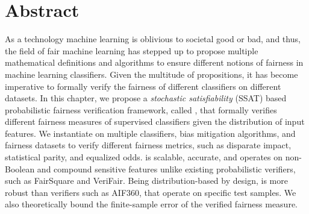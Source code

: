 \section{Abstract}
	As a technology machine learning is oblivious to societal good or bad, and thus, the field of fair machine learning has stepped up to propose multiple mathematical definitions and algorithms to ensure different notions of fairness in machine learning classifiers.	Given the multitude of propositions, it has become imperative to formally verify the fairness of different classifiers on different datasets.	In this chapter, we propose a \textit{stochastic satisfiability} (SSAT) based probabilistic fairness verification framework, called {\justicia}, that formally verifies different fairness measures of supervised classifiers given the distribution of input features. We instantiate {\justicia} on multiple classifiers, bias mitigation algorithms, and fairness datasets to verify different fairness metrics, such as disparate impact, statistical parity, and equalized odds.
	{\justicia} is scalable, accurate, and operates on non-Boolean and compound sensitive features unlike existing probabilistic verifiers, such as FairSquare and VeriFair.
	Being distribution-based by design, {\justicia} is more robust than verifiers such as AIF360, that operate on specific test samples.
	We also theoretically bound the finite-sample error of the verified fairness measure.

